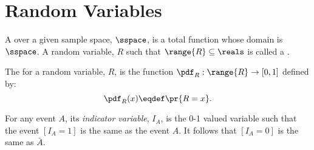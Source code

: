 \documentclass[handout]{mcs}
\begin{document}









\instatements{\newpage}
\section{Random Variables}

\iffalse

\subsection*{Stirling's Approximation}
\[
n! \sim \sqrt{2\pi n}\paren{\frac{n}{e}}^n
\]
\fi


A  over a given sample space, $\sspace$, is a total
function whose domain is $\sspace$.  A random variable, $R$ such that
$\range{R} \subseteq \reals$ is called a .

The  for a random variable, $R$,
is the function $\pdf_R : \range{R} \to [0,1]$ defined by:
\[
\pdf_R(x) \eqdef \pr{R = x}.
\]

\iffalse

The \emph{cumulative distribution function}, $\cdf_R: \range{R} \to
[0,1]$, is defined by:
\[
\cdf_R(x) \eqdef \pr{R \le x}.
\]
\fi

For any event $A$, its \emph{indicator variable}, $I_A$, is the 0-1 valued
variable such that the event $[I_A = 1]$ is the same as the event $A$.  It
follows that $[I_A = 0]$ is the same as $\bar{A}$.
\end{document}
